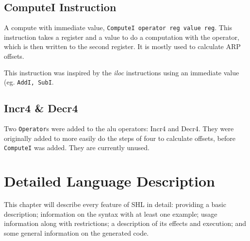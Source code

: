 \documentclass[twoside]{report}
\begin{document}
\section{ComputeI Instruction}
\label{computei_instruction}
A compute with immediate value, \texttt{ComputeI operator reg value reg}. This instruction takes a register and a value to do a computation with the operator, which is then written to the second register. It is mostly used to calculate ARP offsets. 

This instruction was inspired by the \emph{iloc} instructions using an immediate value (eg. \texttt{AddI, SubI}.

\section{Incr4 \& Decr4}
\label{incr4_and_decr4}
Two \texttt{Operator}s were added to the alu operators: Incr4 and Decr4. They were originally added to more easily do the steps of four to calculate offsets, before \texttt{ComputeI} was added. They are currently unused.


\chapter{Detailed Language Description}
\label{detailed_language_description}
This chapter will describe every feature of SHL in detail: providing a basic description; information on the syntax with at least one example; usage information along with restrictions; a description of its effects and execution; and some general information on the generated code.

\end{document}
